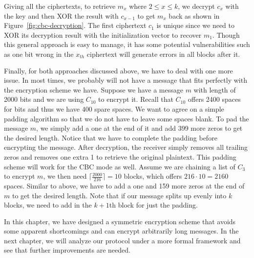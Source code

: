 Giving all the ciphertexts, to retrieve $m_x$ where $2 \leq x \leq k$, we decrypt $c_x$ with the key and then XOR the result with $c_{x-1}$ to get $m_x$ back as shown in Figure~\ref{fig:cbc-decryption}. The first ciphertext $c_1$ is unique since we need to XOR its decryption result with the initialization vector to recover $m_1$. Though this general approach is easy to manage, it has some potential vulnerabilities such as one bit wrong in the $x_{th}$ ciphertext will generate errors in all blocks after it.
\par Finally, for both approaches discussed above, we have to deal with one more issue. In most times, we probably will not have a message that fits perfectly with the encryption scheme we have. Suppose we have a message $m$ with length of 2000 bits and we are using $C_{10}$ to encrypt it. Recall that $C_{10}$ offers 2400 spaces for bits and thus we have 400 spare spaces. We want to agree on a simple padding algorithm so that we do not have to leave some spaces blank. To pad the message $m$, we simply add a one at the end of it and add 399 more zeros to get the desired length. Notice that we have to complete the padding before encrypting the message. After decryption, the receiver simply removes all trailing zeros and removes one extra 1 to retrieve the original plaintext. This padding scheme will work for the CBC mode as well. Assume we are chaining a list of $C_3$ to encrypt $m$, we then need $\lceil \frac{2000}{216} \rceil = 10$ blocks, which offers $216 \cdot 10 = 2160$ spaces. Similar to above, we have to add a one and 159 more zeros at the end of $m$ to get the desired length. Note that if our message splits up evenly into $k$ blocks, we need to add in the $k+1$th block for just the padding.
\par In this chapter, we have designed a symmetric encryption scheme that avoids some apparent shortcomings and can encrypt arbitrarily long messages. In the next chapter, we will analyze our protocol under a more formal framework and see that further improvements are needed.